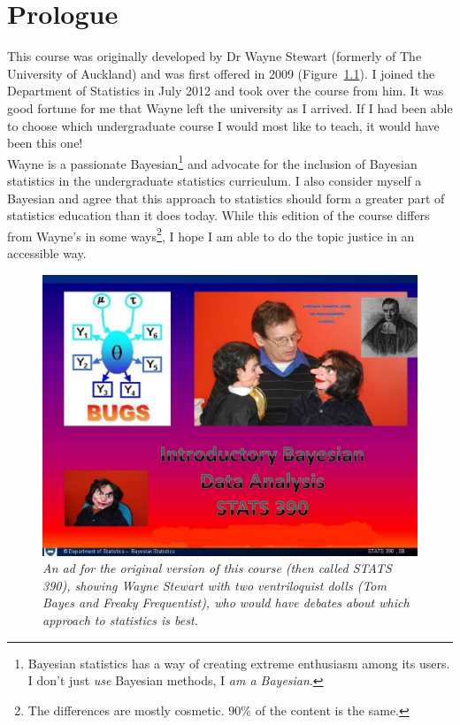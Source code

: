\chapter{Prologue}
This course was originally developed by Dr Wayne Stewart (formerly of The
University of
Auckland) and was first offered in 2009 (Figure~\ref{fig:wayne}).
I joined the Department of Statistics in July 2012
and took over the course from him. It was good fortune for me that Wayne left
the university as I arrived. If I had been able to choose which undergraduate
course I would most like to teach, it would have been this one!\\

Wayne is a passionate Bayesian\footnote{Bayesian statistics has a way of
creating extreme enthusiasm among its users. I don't just {\it use} Bayesian
methods, I {\it am a Bayesian}.}
and advocate
for the inclusion of Bayesian statistics in the undergraduate
statistics curriculum. I also consider myself a Bayesian and agree that this
approach to statistics should form a greater part of statistics education
than it does today.
While this edition of the course differs from Wayne's in some ways\footnote{
The differences are mostly cosmetic. 90\% of the content is the same.},
I hope I am able to do the topic justice in an accessible way.\\

\begin{figure}[!ht]
\begin{center}
\includegraphics[scale=0.5]{Figures/390course.jpg}
\end{center}
\caption{\it An ad for the original version of this course (then called
STATS 390), showing Wayne Stewart with two ventriloquist dolls (Tom Bayes and
Freaky Frequentist), who would have debates about which approach to statistics
is best.\label{fig:wayne}}
\end{figure}

